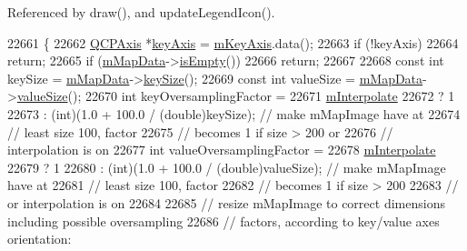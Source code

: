Referenced by draw(), and update\+Legend\+Icon().


\begin{DoxyCode}
22661                                  \{
22662   \hyperlink{class_q_c_p_axis}{QCPAxis} *\hyperlink{class_q_c_p_abstract_plottable_a72c7a09c22963f2c943f07112b311103}{keyAxis} = \hyperlink{class_q_c_p_abstract_plottable_a426f42e254d0f8ce5436a868c61a6827}{mKeyAxis}.data();
22663   \textcolor{keywordflow}{if} (!keyAxis)
22664     \textcolor{keywordflow}{return};
22665   \textcolor{keywordflow}{if} (\hyperlink{class_q_c_p_color_map_a8709272aa8f0be3ca111bf3866806f8b}{mMapData}->\hyperlink{class_q_c_p_color_map_data_a986009324aee1fc5f696db46bd03dde5}{isEmpty}())
22666     \textcolor{keywordflow}{return};
22667 
22668   \textcolor{keyword}{const} \textcolor{keywordtype}{int} keySize = \hyperlink{class_q_c_p_color_map_a8709272aa8f0be3ca111bf3866806f8b}{mMapData}->\hyperlink{class_q_c_p_color_map_data_aa8d7811686fdfea964947715210c4af8}{keySize}();
22669   \textcolor{keyword}{const} \textcolor{keywordtype}{int} valueSize = \hyperlink{class_q_c_p_color_map_a8709272aa8f0be3ca111bf3866806f8b}{mMapData}->\hyperlink{class_q_c_p_color_map_data_ab880be6bc587f34e8d22fe77ef6b57e9}{valueSize}();
22670   \textcolor{keywordtype}{int} keyOversamplingFactor =
22671       \hyperlink{class_q_c_p_color_map_af77e5eba9a844592648edeb6fbe834f1}{mInterpolate}
22672           ? 1
22673           : (int)(1.0 + 100.0 / (\textcolor{keywordtype}{double})keySize); \textcolor{comment}{// make mMapImage have at}
22674                                                   \textcolor{comment}{// least size 100, factor}
22675                                                   \textcolor{comment}{// becomes 1 if size > 200 or}
22676                                                   \textcolor{comment}{// interpolation is on}
22677   \textcolor{keywordtype}{int} valueOversamplingFactor =
22678       \hyperlink{class_q_c_p_color_map_af77e5eba9a844592648edeb6fbe834f1}{mInterpolate}
22679           ? 1
22680           : (int)(1.0 + 100.0 / (\textcolor{keywordtype}{double})valueSize); \textcolor{comment}{// make mMapImage have at}
22681                                                     \textcolor{comment}{// least size 100, factor}
22682                                                     \textcolor{comment}{// becomes 1 if size > 200}
22683                                                     \textcolor{comment}{// or interpolation is on}
22684 
22685   \textcolor{comment}{// resize mMapImage to correct dimensions including possible oversampling}
22686   \textcolor{comment}{// factors, according to key/value axes orientation:}

\end{DoxyCode}

